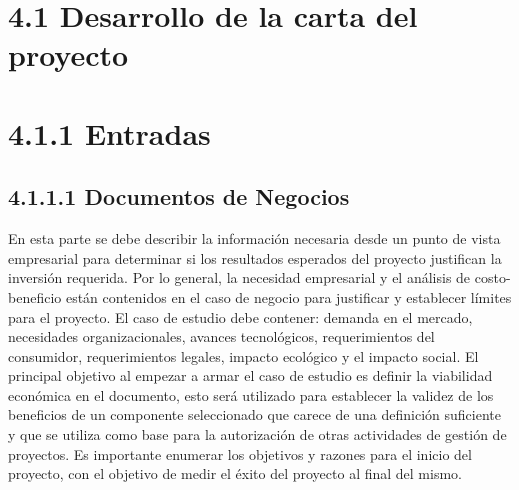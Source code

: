 \documentclass[letterpaper,12pt,openright,oneside]{article}
\theoremstyle{plain}
\begin{document}
\newpage
\hypersetup{linkcolor=black}
\tableofcontents

\newpage
\linenumbers

\section*{4.1 Desarrollo de la carta del proyecto}

\section*{4.1.1 Entradas}
% 
% 
\subsection*{4.1.1.1 Documentos de Negocios}

En esta parte se debe describir la información necesaria desde un punto de vista empresarial para determinar si los resultados esperados del proyecto justifican la inversión requerida. Por lo general, la necesidad empresarial y el análisis de costo-beneficio están contenidos en el caso de negocio para justificar y establecer límites para el proyecto. El caso de estudio debe contener: demanda en el mercado, necesidades organizacionales, avances tecnológicos, requerimientos del consumidor, requerimientos legales, impacto ecológico y el impacto social. 
El principal objetivo al empezar a armar el caso de estudio es definir la viabilidad económica en el documento, esto será utilizado para establecer la validez de los beneficios de un componente seleccionado que carece de una definición suficiente y que se utiliza como base para la autorización de otras actividades de gestión de proyectos. Es importante enumerar los objetivos y razones para el inicio del proyecto, con el objetivo de medir el éxito del proyecto al final del mismo.
\end{document}
